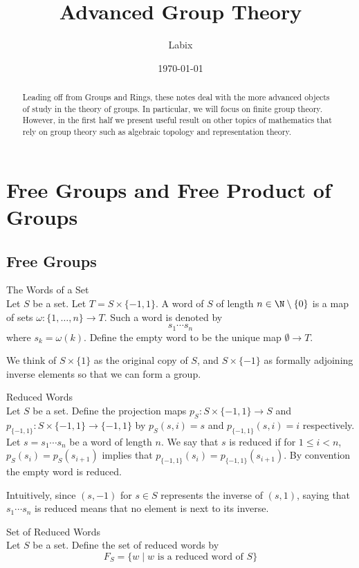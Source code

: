 \documentclass[a4paper]{article}
\title{Advanced Group Theory}
\author{Labix}
\date{\today}
\begin{document}
\maketitle
\begin{abstract}
Leading off from Groups and Rings, these notes deal with the more advanced objects of study in the theory of groups. In particular, we will focus on finite group theory. However, in the first half we present useful result on other topics of mathematics that rely on group theory such as algebraic topology and representation theory. 
\end{abstract}
\pagebreak
\tableofcontents
\pagebreak

\section{Free Groups and Free Product of Groups}
\subsection{Free Groups}
\begin{defn}{The Words of a Set}{}\\
Let $S$ be a set. Let $T=S\times\{-1,1\}$. A word of $S$ of length $n\in\N\setminus\{0\}$ is a map of sets $\omega:\{1,\dots,n\}\to T$. Such a word is denoted by $$s_1\cdots s_n$$ where $s_k=\omega(k)$. Define the empty word to be the unique map $\emptyset\to T$. 
\end{defn}

We think of $S\times\{1\}$ as the original copy of $S$, and $S\times\{-1\}$ as formally adjoining inverse elements so that we can form a group. 

\begin{defn}{Reduced Words}{}\\
Let $S$ be a set. Define the projection maps $p_S:S\times\{-1,1\}\to S$ and $p_{\{-1,1\}}:S\times\{-1,1\}\to\{-1,1\}$ by $p_S(s,i)=s$ and $p_{\{-1,1\}}(s,i)=i$ respectively. Let $s=s_1\cdots s_n$ be a word of length $n$. We say that $s$ is reduced if for $1\leq i<n$, $p_S(s_i)=p_S(s_{i+1})$ implies that $p_{\{-1,1\}}(s_i)=p_{\{-1,1\}}(s_{i+1})$. By convention the empty word is reduced. 
\end{defn}

Intuitively, since $(s,-1)$ for $s\in S$ represents the inverse of $(s,1)$, saying that $s_1\cdots s_n$ is reduced means that no element is next to its inverse. 

\begin{defn}{Set of Reduced Words}{}\\
Let $S$ be a set. Define the set of reduced words by $$F_S=\{w\;|\;w\text{ is a reduced word of }S\}$$
\end{defn}
\end{document}
